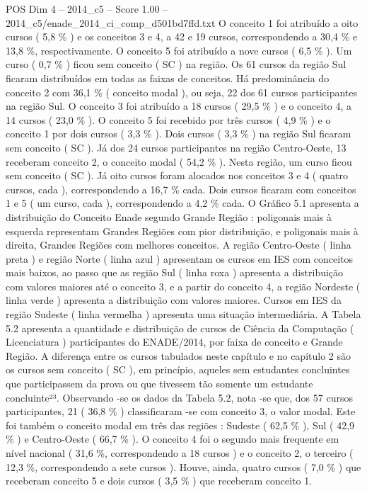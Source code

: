 \begin{textsample}{POS Dim 4 – 2014\_c5 – Score 1.00 – 2014\_c5/enade\_2014\_ci\_comp\_d501bd7ffd.txt}
O conceito 1 foi atribuído a oito cursos ( 5,8 \% ) e os conceitos 3 e 4, a 42 e 19 cursos, correspondendo a 30,4 \% e 13,8 \%, respectivamente.
O conceito 5 foi atribuído a nove cursos ( 6,5 \% ).
Um curso ( 0,7 \% ) ficou sem conceito ( SC ) na região.
Os 61 cursos da região Sul ficaram distribuídos em todas as faixas de conceitos.
Há predominância do conceito 2 com 36,1 \% ( conceito modal ), ou seja, 22 dos 61 cursos participantes na região Sul.
O conceito 3 foi atribuído a 18 cursos ( 29,5 \% ) e o conceito 4, a 14 cursos ( 23,0 \% ).
O conceito 5 foi recebido por três cursos ( 4,9 \% ) e o conceito 1 por dois cursos ( 3,3 \% ).
Dois cursos ( 3,3 \% ) na região Sul ficaram sem conceito ( SC ).
Já dos 24 cursos participantes na região Centro-Oeste, 13 receberam conceito 2, o conceito modal ( 54,2 \% ).
Nesta região, um curso ficou sem conceito ( SC ).
Já oito cursos foram alocados nos conceitos 3 e 4 ( quatro cursos, cada ), correspondendo a 16,7 \% cada.
Dois cursos ficaram com conceitos 1 e 5 ( um curso, cada ), correspondendo a 4,2 \% cada.
O Gráfico 5.1 apresenta a distribuição do Conceito Enade segundo Grande Região : poligonais mais à esquerda representam Grandes Regiões com pior distribuição, e poligonais mais à direita, Grandes Regiões com melhores conceitos.
A região Centro-Oeste ( linha preta ) e região Norte ( linha azul ) apresentam os cursos em IES com conceitos mais baixos, ao passo que as região Sul ( linha roxa ) apresenta a distribuição com valores maiores até o conceito 3, e a partir do conceito 4, a região Nordeste ( linha verde ) apresenta a distribuição com valores maiores.
Cursos em IES da região Sudeste ( linha vermelha ) apresenta uma situação intermediária.
A Tabela 5.2 apresenta a quantidade e distribuição de cursos de Ciência da Computação ( Licenciatura ) participantes do ENADE/2014, por faixa de conceito e Grande Região.
A diferença entre os cursos tabulados neste capítulo e no capítulo 2 são os cursos sem conceito ( SC ), em princípio, aqueles sem estudantes concluintes que participassem da prova ou que tivessem tão somente um estudante concluinte²³.
Observando -se os dados da Tabela 5.2, nota -se que, dos 57 cursos participantes, 21 ( 36,8 \% ) classificaram -se com conceito 3, o valor modal.
Este foi também o conceito modal em três das regiões : Sudeste ( 62,5 \% ), Sul ( 42,9 \% ) e Centro-Oeste ( 66,7 \% ).
O conceito 4 foi o segundo mais frequente em nível nacional ( 31,6 \%, correspondendo a 18 cursos ) e o conceito 2, o terceiro ( 12,3 \%, correspondendo a sete cursos ).
Houve, ainda, quatro cursos ( 7,0 \% ) que receberam conceito 5 e dois cursos ( 3,5 \% ) que receberam conceito 1.

\end{textsample}
